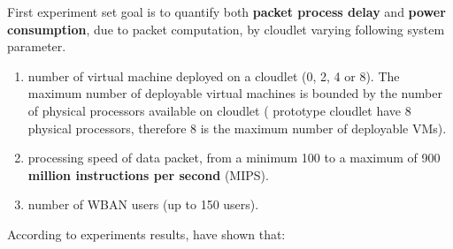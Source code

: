 \documentclass[sigchi]{acmart}
\begin{document}
First experiment set goal is to quantify both \textbf{packet process delay} and \textbf{power consumption}, due to packet computation, by cloudlet varying following system parameter.

\begin{enumerate}

\item number of virtual machine deployed on a cloudlet (0, 2, 4 or 8). The maximum number of deployable virtual machines is bounded by the number of physical processors available on cloudlet (\citet{MSAReport} prototype cloudlet have 8 physical processors, therefore 8 is the maximum number of deployable VMs).
 
\item processing speed of data packet, from a minimum 100 to a maximum of 900 \textbf{million instructions per second} (MIPS).

\item number of WBAN users (up to 150 users).

\end{enumerate}

According to experiments results, \citet{MSAReport} have shown that:
\end{document}
